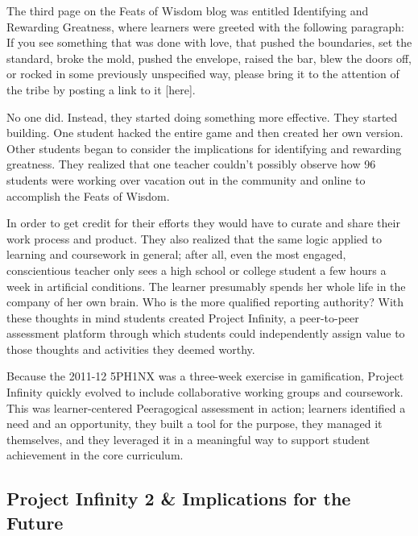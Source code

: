 The third page on the Feats of Wisdom blog was entitled Identifying and
Rewarding Greatness, where learners were greeted with the following
paragraph: If you see something that was done with love, that pushed the
boundaries, set the standard, broke the mold, pushed the envelope,
raised the bar, blew the doors off, or rocked in some previously
unspecified way, please bring it to the attention of the tribe by
posting a link to it {[}here{]}. 

No one did. Instead, they started doing something more effective. They
started building. One student hacked the entire game and then created
her own version. Other students began to consider the implications for
identifying and rewarding greatness. They realized that one teacher
couldn't possibly observe how 96 students were working over vacation
out in the community and online to accomplish the Feats of Wisdom.

In order to get credit for their efforts they would have to curate and
share their work process and product. They also realized that the same
logic applied to learning and coursework in general; after all, even
the most engaged, conscientious teacher only sees a high school or
college student a few hours a week in artificial conditions. The
learner presumably spends her whole life in the company of her own
brain. Who is the more qualified reporting authority? With these
thoughts in mind students created Project Infinity, a peer-to-peer
assessment platform through which students could independently assign
value to those thoughts and activities they deemed worthy. 

Because the 2011-12 5PH1NX was a three-week exercise in gamification,
Project Infinity quickly evolved to include collaborative working
groups and coursework. This was learner-centered Peeragogical
assessment in action; learners identified a need and an opportunity,
they built a tool for the purpose, they managed it themselves, and
they leveraged it in a meaningful way to support student achievement
in the core curriculum.

\subsection{Project Infinity 2 \& Implications for the Future}

